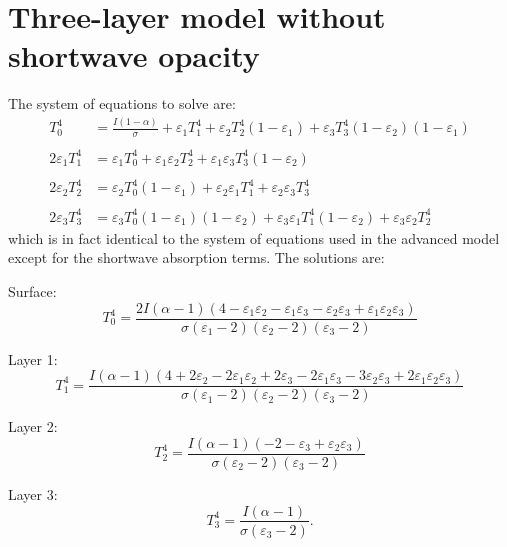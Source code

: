 \documentclass[a4paper,12pt]{article}
\begin{document}
\section{Three-layer model without shortwave opacity}
The system of equations to solve are:
\begin{align*}
        T_0^4&=\frac{I(1-\alpha)}{\sigma}+\varepsilon_1  T_1^4 + \varepsilon_2  T_2^4(1-\varepsilon_1)+\varepsilon_3 T_3^4 (1-\varepsilon_2) (1-\varepsilon_1)\\
        &\\
        2 \varepsilon_1 T_1^4&=\varepsilon_1  T_0^4 + \varepsilon_1 \varepsilon_2  T_2^4 +\varepsilon_1 \varepsilon_3 T_3^4 (1-\varepsilon_2)\\
        &\\
        2\varepsilon_2  T_2^4&=\varepsilon_2  T_0^4 (1-\varepsilon_1) + \varepsilon_2 \varepsilon_1  T_1^4 + \varepsilon_2 \varepsilon_3  T_3^4\\
        &\\
        2 \varepsilon_3  T_3^4&=\varepsilon_3  T_0^4 (1-\varepsilon_1) (1-\varepsilon_2) + \varepsilon_3 \varepsilon_1  T_1^4(1-\varepsilon_2)+\varepsilon_3\varepsilon_2 T_2^4
\end{align*}
which is in fact identical to the system of equations used in the advanced model except for the shortwave absorption terms. The solutions are:

Surface:
\begin{equation*}
    T_0^4=\frac{2I(\alpha-1)(4-\varepsilon_1 \varepsilon_2 - \varepsilon_1 \varepsilon_3 - \varepsilon_2 \varepsilon_3 + \varepsilon_1 \varepsilon_2 \varepsilon_3)}{\sigma(\varepsilon_1-2)(\varepsilon_2-2)(\varepsilon_3-2)}
\end{equation*}

Layer 1:
\begin{equation*}
    T_1^4=\frac{I(\alpha-1)(4+2\varepsilon_2 -2\varepsilon_1 \varepsilon_2 + 2\varepsilon_3 - 2\varepsilon_1 \varepsilon_3 -3 \varepsilon_2 \varepsilon_3 + 2\varepsilon_1 \varepsilon_2 \varepsilon_3)}{\sigma(\varepsilon_1-2)(\varepsilon_2-2)(\varepsilon_3-2)}
\end{equation*}

Layer 2:
\begin{equation*}
    T_2^4=\frac{I(\alpha-1)(-2-\varepsilon_3+\varepsilon_2\varepsilon_3)}{\sigma(\varepsilon_2-2)(\varepsilon_3-2)}
\end{equation*}

Layer 3:
\begin{equation*}
    T_3^4 = \frac{I(\alpha-1)}{\sigma(\varepsilon_3-2)}.
\end{equation*}
\end{document}
